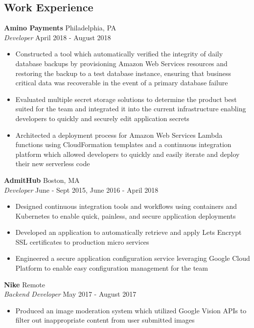\documentclass[10pt]{article}
\begin{document}
\begin{flushleft}
\section{Work Experience}
	\textbf{Amino Payments} \hfill Philadelphia, PA \\
	\textit{Developer} \hfill April 2018 - August 2018 \\
	\begin{itemize}
		\item Constructed a tool which automatically verified the integrity of daily database backups by provisioning
			Amazon Web Services resources and restoring the backup to a test database instance, ensuring that business 
			critical data was recoverable in the event of a primary database failure

		\item Evaluated multiple secret storage solutions to determine the product best suited for the team and
			integrated it into the current infrastructure enabling developers to quickly and securely edit 
			application secrets

		\item Architected a deployment process for Amazon Web Services Lambda functions using CloudFormation templates
			and a continuous integration platform which allowed developers to quickly and easily iterate and deploy 
			their new serverless code
	\end{itemize}


	\vspace{0.5em}
	\textbf{AdmitHub} \hfill Boston, MA \\
	\textit{Developer} \hfill June - Sept 2015, June 2016 - April 2018 \\
	\begin{itemize}
		\item Designed continuous integration tools and workflows using containers and Kubernetes to enable quick, 
			painless, and secure application deployments

		\item Developed an application to automatically retrieve and apply Lets Encrypt SSL certificates to production 
			micro services

		\item Engineered a secure application configuration service leveraging Google Cloud Platform to enable easy 
		      configuration management for the team
	\end{itemize}

	\vspace{0.5em}
	\textbf{Nike} \hfill Remote \\
	\textit{Backend Developer} \hfill May 2017 - August 2017 \\
	\begin{itemize}
		\item Produced an image moderation system which utilized Google Vision APIs to filter out inappropriate content 
		    from user submitted images


\end{itemize}
\end{flushleft}
\end{document}
